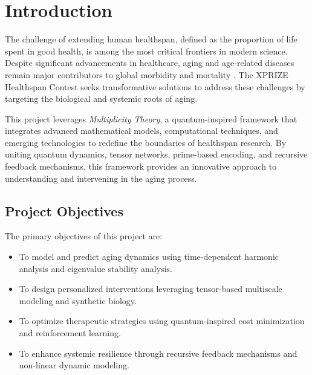 \documentclass{article}
\theoremstyle{plain}
\begin{document}
\section{Introduction}
\label{sec:introduction}

The challenge of extending human healthspan, defined as the proportion of life spent in good health, is among the most critical frontiers in modern science. Despite significant advancements in healthcare, aging and age-related diseases remain major contributors to global morbidity and mortality \cite{worldhealth2022}. The XPRIZE Healthspan Contest seeks transformative solutions to address these challenges by targeting the biological and systemic roots of aging.

This project leverages \textit{Multiplicity Theory}, a quantum-inspired framework that integrates advanced mathematical models, computational techniques, and emerging technologies to redefine the boundaries of healthspan research. By uniting quantum dynamics, tensor networks, prime-based encoding, and recursive feedback mechanisms, this framework provides an innovative approach to understanding and intervening in the aging process.

\subsection{Project Objectives}
The primary objectives of this project are:
\begin{itemize}
    \item To model and predict aging dynamics using time-dependent harmonic analysis and eigenvalue stability analysis.
    \item To design personalized interventions leveraging tensor-based multiscale modeling and synthetic biology.
    \item To optimize therapeutic strategies using quantum-inspired cost minimization and reinforcement learning.
    \item To enhance systemic resilience through recursive feedback mechanisms and non-linear dynamic modeling.
\end{itemize}
\end{document}
